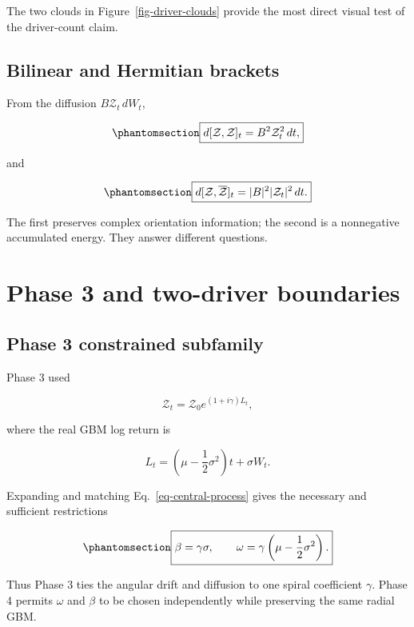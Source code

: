 \documentclass[
  english,
  10pt,
  letterpaper,
  DIV=11,
  numbers=noendperiod]{scrartcl}
\begin{document}
The two clouds in Figure~\ref{fig-driver-clouds} provide the most direct
visual test of the driver-count claim.

\subsection{Bilinear and Hermitian
brackets}\label{bilinear-and-hermitian-brackets}

From the diffusion \(B\mathcal Z_t\,dW_t\),

\begin{equation}\protect\phantomsection\label{eq-bilinear-bracket}{
\boxed{
d[\mathcal Z,\mathcal Z]_t
=B^2\mathcal Z_t^2\,dt,
}
}\end{equation}

and

\begin{equation}\protect\phantomsection\label{eq-hermitian-bracket}{
\boxed{
d[\mathcal Z,\overline{\mathcal Z}]_t
=|B|^2|\mathcal Z_t|^2\,dt.
}
}\end{equation}

The first preserves complex orientation information; the second is a
nonnegative accumulated energy. They answer different questions.

\section{Phase 3 and two-driver boundaries}\label{sec-boundaries}

\subsection{Phase 3 constrained
subfamily}\label{phase-3-constrained-subfamily}

Phase 3 used

\[
\mathcal Z_t
=
\mathcal Z_0e^{(1+i\gamma)L_t},
\]

where the real GBM log return is

\[
L_t
=
\left(\mu-\frac12\sigma^2\right)t+\sigma W_t.
\]

Expanding and matching Eq.~\ref{eq-central-process} gives the necessary
and sufficient restrictions

\begin{equation}\protect\phantomsection\label{eq-phase3-restrictions}{
\boxed{
\beta=\gamma\sigma,\qquad
\omega=\gamma\left(\mu-\frac12\sigma^2\right).
}
}\end{equation}

Thus Phase 3 ties the angular drift and diffusion to one spiral
coefficient \(\gamma\). Phase 4 permits \(\omega\) and \(\beta\) to be
chosen independently while preserving the same radial GBM.
\end{document}
